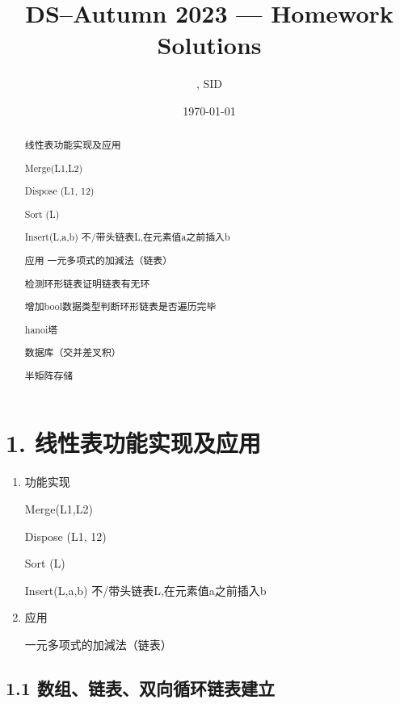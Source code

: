 \documentclass[UTF8]{ctexart}
\title{DS--Autumn 2023 --- Homework \Homework Solutions} %
\author{\Name, SID \SID} %
\date{\today} %
\newenvironment{qparts}{\begin{enumerate}[{(}a{)}]}{\end{enumerate}} %
\begin{document}
\maketitle


\begin{abstract}
    线性表功能实现及应用
    
    Merge(L1,L2)

    Dispose (L1, 12)

    Sort (L)
  
    Insert(L,a,b) 不/带头链表L,在元素值a之前插入b

    应用 一元多项式的加減法（链表）



    检测环形链表证明链表有无环

    增加bool数据类型判断环形链表是否遍历完毕

    hanoi塔

    数据库（交并差叉积）
    
    半矩阵存储

\end{abstract}













\section*{1. 线性表功能实现及应用}
\begin{qparts}
    \item 
    功能实现
    
    Merge(L1,L2)

    Dispose (L1, 12)

    Sort (L)
  
    Insert(L,a,b) 不/带头链表L,在元素值a之前插入b

    \item
    应用 
    
    一元多项式的加減法（链表）
\end{qparts}

\subsection*{1.1 数组、链表、双向循环链表建立}
\end{document}
